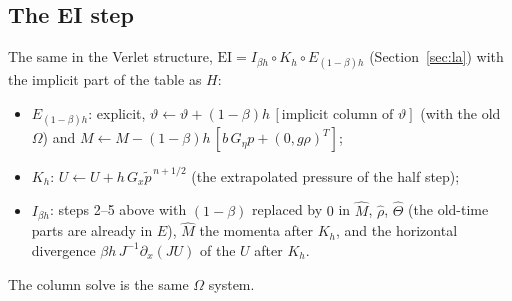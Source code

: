 \documentclass[11pt,a4paper]{article}
\newcommand{\tv}{\vartheta}   %
\begin{document}
\subsection{The EI step}
The same in the Verlet structure, $\text{EI}=I_{\beta h}\circ K_h\circ E_{(1-\beta)h}$ (Section~\ref{sec:la}) with the implicit part of the
table as $H$:
\begin{itemize}
\item $E_{(1-\beta)h}$: explicit, $\tv\leftarrow\tv+(1-\beta)h\,[\text{implicit column of }\tv]$ (with the old $\Omega$) and
$M\leftarrow M-(1-\beta)h\,[b\,G_\eta p+(0,g\rho)^T]$;
\item $K_h$: $U\leftarrow U+h\,G_x\tilde p^{\,n+1/2}$ (the extrapolated pressure of the half step);
\item $I_{\beta h}$: steps 2--5 above with $(1-\beta)$ replaced by $0$ in $\hat M$, $\hat\rho$, $\hat\Theta$ (the old-time parts are already in
$E$), $\hat M$ the momenta after $K_h$, and the horizontal divergence $\beta h\,J^{-1}\partial_x(JU)$ of the $U$ after $K_h$.
\end{itemize}
The column solve is the same $\Omega$ system.
\end{document}
